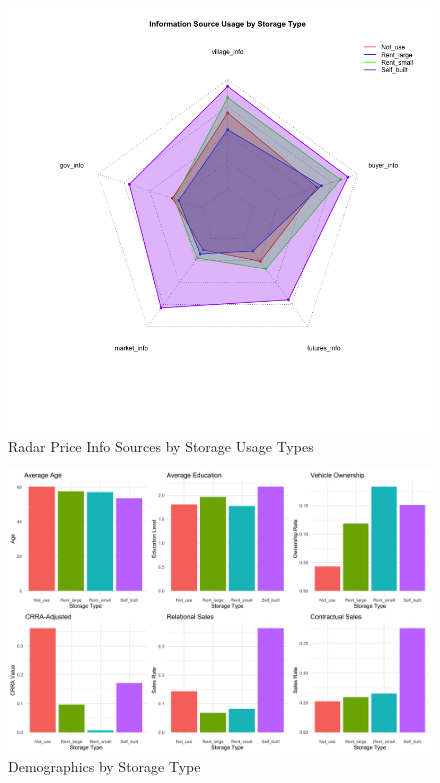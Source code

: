 \documentclass[12pt]{article}
\begin{document}
\begin{figure}[H]
\centering
\includegraphics[width=1\textwidth]{Figures/radar_storage_info.png}
\caption{Radar Price Info Sources by Storage Usage Types}
\label{Figure: radar}
\end{figure}

\begin{figure}[H]
\centering
\includegraphics[width=1\textwidth]{Figures/combined_storage_metrics.png}
\caption{Demographics by Storage Type}
\label{Figure: Demographics by Storage Type}
\end{figure}
\end{document}

